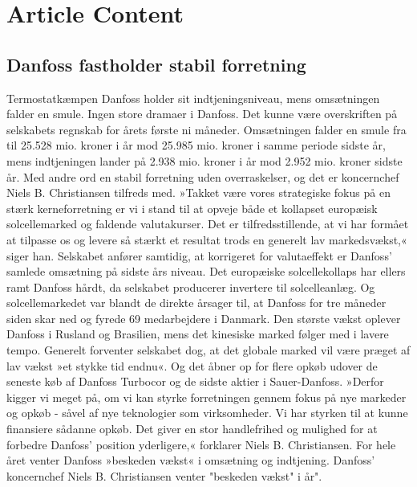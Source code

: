 \chapter{Article Content}
\section{Danfoss fastholder stabil forretning}
\label{Levmig1:text}
	Termostatkæmpen Danfoss holder sit indtjeningsniveau, mens omsætningen falder en smule.
	Ingen store dramaer i Danfoss.
	Det kunne være overskriften på selskabets regnskab for årets første ni måneder. Omsætningen falder en smule fra til 25.528 mio. kroner i år mod 25.985 mio. kroner i samme periode sidste år, mens indtjeningen lander på 2.938 mio. kroner i år mod 2.952 mio. kroner sidste år.
	Med andre ord en stabil forretning uden overraskelser, og det er koncernchef Niels B. Christiansen tilfreds med.
	»Takket være vores strategiske fokus på en stærk kerneforretning er vi i stand til at opveje både et kollapset europæisk solcellemarked og faldende valutakurser. Det er tilfredsstillende, at vi har formået at tilpasse os og levere så stærkt et resultat trods en generelt lav markedsvækst,« siger han.
	Selskabet anfører samtidig, at korrigeret for valutaeffekt er Danfoss' samlede omsætning på sidste års niveau.
	Det europæiske solcellekollaps har ellers ramt Danfoss hårdt, da selskabet producerer invertere til solcelleanlæg. Og solcellemarkedet var blandt de direkte årsager til, at Danfoss for tre måneder siden skar ned og fyrede 69 medarbejdere i Danmark.
	Den største vækst oplever Danfoss i Rusland og Brasilien, mens det kinesiske marked følger med i lavere tempo. Generelt forventer selskabet dog, at det globale marked vil være præget af lav vækst »et stykke tid endnu«. Og det åbner op for flere opkøb udover de seneste køb af Danfoss Turbocor og de sidste aktier i Sauer-Danfoss.
	»Derfor kigger vi meget på, om vi kan styrke forretningen gennem fokus på nye markeder og opkøb - såvel af nye teknologier som virksomheder. Vi har styrken til at kunne finansiere sådanne opkøb. Det giver en stor handlefrihed og mulighed for at forbedre Danfoss' position yderligere,« forklarer Niels B. Christiansen.
	For hele året venter Danfoss »beskeden vækst« i omsætning og indtjening.
	Danfoss' koncernchef Niels B. Christiansen venter "beskeden vækst" i år".

